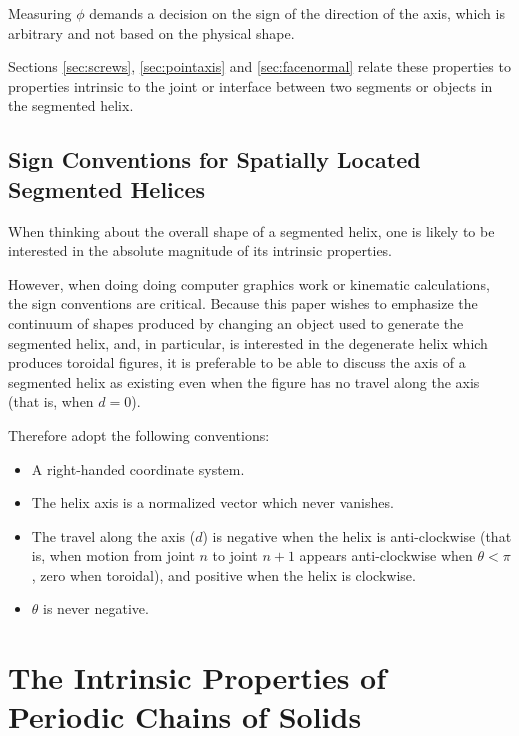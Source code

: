 \documentclass[11pt]{article}
\begin{document}
{Measuring $\phi$ demands a decision on the sign of the direction of the axis,
which is arbitrary and not based on the
physical shape.

Sections \ref{sec:screws}, \ref{sec:pointaxis} and \ref{sec:facenormal}
relate these properties to properties intrinsic to the joint or interface between
two segments or objects in the segmented helix.

\label{sec:SegmentedHelix}

\subsection{Sign Conventions for Spatially Located Segmented Helices}

When thinking about the overall shape of a segmented helix, one is
likely to be interested in the absolute magnitude of its intrinsic
properties.

However, when doing doing computer graphics work or kinematic
calculations, the sign conventions are critical. Because this
paper wishes to emphasize the continuum of shapes produced by
changing an object used to generate the segmented helix, and,
in particular, is interested in the degenerate helix which
produces toroidal figures, it is preferable to be able to discuss
the axis of a segmented helix as existing even when the
figure has no travel along the axis (that is, when $d = 0$).

Therefore adopt the following conventions:
\begin{itemize}
\item A right-handed coordinate system.
\item The helix axis is a normalized vector
  which never vanishes.
\item The travel along the axis ($d$) is negative when
  the helix is anti-clockwise (that is, when motion from
  joint $n$ to joint $n+1$ appears anti-clockwise when $\theta < \pi$,
  zero when toroidal), and
  positive when the helix is clockwise.
\item $\theta$ is never negative.
\end{itemize}

\section{The Intrinsic Properties of Periodic Chains of Solids}

}
\end{document}
